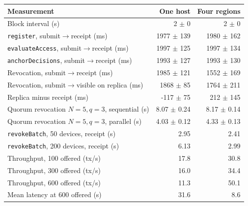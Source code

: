 \begin{tabular}{@{}lrr@{}}
\toprule
Measurement & One host & Four regions \\
\midrule
Block interval (s) & 2 $\pm$ 0 & 2 $\pm$ 0 \\
\texttt{register}, submit$\to$receipt (ms) & 1977 $\pm$ 139 & 1980 $\pm$ 162 \\
\texttt{evaluateAccess}, submit$\to$receipt (ms) & 1997 $\pm$ 125 & 1997 $\pm$ 134 \\
\texttt{anchorDecisions}, submit$\to$receipt (ms) & 1993 $\pm$ 127 & 1993 $\pm$ 130 \\
Revocation, submit$\to$receipt (ms) & 1985 $\pm$ 121 & 1552 $\pm$ 169 \\
Revocation, submit$\to$visible on replica (ms) & 1868 $\pm$ 85 & 1764 $\pm$ 211 \\
Replica minus receipt (ms) & -117 $\pm$ 75 & 212 $\pm$ 145 \\
Quorum revocation $N{=}5,q{=}3$, sequential (s) & 8.07 $\pm$ 0.24 & 8.17 $\pm$ 0.14 \\
Quorum revocation $N{=}5,q{=}3$, parallel (s) & 4.03 $\pm$ 0.12 & 4.33 $\pm$ 0.13 \\
\texttt{revokeBatch}, 50 devices, receipt (s) & 2.95 & 2.41 \\
\texttt{revokeBatch}, 200 devices, receipt (s) & 6.13 & 2.99 \\
Throughput, 100 offered (tx/s) & 17.8 & 30.8 \\
Throughput, 300 offered (tx/s) & 16.0 & 34.4 \\
Throughput, 600 offered (tx/s) & 11.3 & 50.1 \\
Mean latency at 600 offered (s) & 31.6 & 8.6 \\
\bottomrule
\end{tabular}